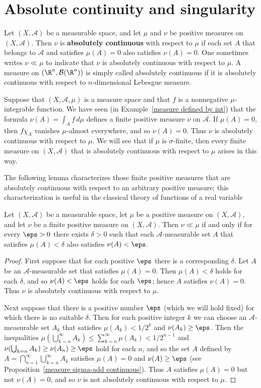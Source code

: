 \section{Absolute continuity and singularity}
Let $(X,\mathcal{A})$ be a measurable space, and let $\mu$ and $\nu$ be positive measures on $(X,\mathcal{A})$. Then $\nu$ is \textbf{absolutely continuous} with respect to $\mu$ if each set $A$ that belongs to $\mathcal{A}$ and satisfies $\mu(A)=0$ also satisfies $\nu(A)=0$. One sometimes writes $\nu\ll\mu$ to indicate that $\nu$ is absolutely continuous with respect to $\mu$. A measure on $(\R^n,\mathcal{B}(\R^n))$ is simply called absolutely continuous if it is absolutely continuous with respect to $n$-dimensional Lebesgue measure.\par
Suppose that $(X,\mathcal{A},\mu)$ is a measure space and that $f$ is a nonnegative $\mu$-integrable function. We have seen (in Example~\ref{measure defined by int}) that the formula $\nu(A)=\int_Af\,d\mu$ defines a finite positive measure $\nu$ on $\mathcal{A}$. If $\mu(A)=0$, then $f\chi_A$ vanishes $\mu$-almost everywhere, and so $\nu(A)=0$. Thus $\nu$ is absolutely continuous with respect to $\mu$. We will see that if $\mu$ is $\sigma$-finite, then every finite measure on $(X,\mathcal{A})$ that is absolutely continuous with respect to $\mu$ arises in this way.\par
The following lemma characterizes those finite positive measures that are absolutely continuous with respect to an arbitrary positive measure; this characterization is useful in the classical theory of functions of a real variable
\begin{lemma}\label{measure finite absolutely continuous iff}
Let $(X,\mathcal{A})$ be a measurable space, let $\mu$ be a positive measure on $(X,\mathcal{A})$, and let $\nu$ be a finite positive measure on $(X,\mathcal{A})$. Then $\nu\ll\mu$ if and only if for every $\eps>0$ there exists $\delta>0$ such that each $\mathcal{A}$-measurable set $A$ that satisfies $\mu(A)<\delta$ also satisfies $\nu(A)<\eps$.
\end{lemma}
\begin{proof}
First suppose that for each positive $\eps$ there is a corresponding $\delta$. Let $A$ be an $\mathcal{A}$-measurable set that satisfies $\mu(A)=0$. Then $\mu(A)<\delta$ holds for each $\delta$, and so $\nu(A)<\eps$ holds for each $\eps$; hence $A$ satisfies $\nu(A)=0$. Thus $\nu$ is absolutely continuous with respect to $\mu$.\par
Next suppose that there is a positive number $\eps$ (which we will hold fixed) for which there is no suitable $\delta$. Then for each positive integer $k$ we can choose an $\mathcal{A}$-measurable set $A_k$ that satisfies $\mu(A_k)<1/2^k$ and $\nu(A_k)\geq\eps$. Then the inequalities $\mu(\bigcup_{k=n}^{\infty}A_k)\leq\sum_{k=n}^{\infty}\mu(A_k)<1/2^{n-1}$ and $\nu(\bigcup_{k=n}A_k)\geq\nu(A_n)\geq\eps$ hold for each $n$, and so the set $A$ defined by $A=\bigcap_{n=1}^{\infty}\bigcup_{k=n}^{\infty}A_k$ satisfies $\mu(A)=0$ and $\nu(A)\geq\eps$ (see Proposition~\ref{measure sigma-add continuous}). Thus $A$ satisfies $\mu(A)=0$ but not $\nu(A)=0$, and so $\nu$ is not absolutely continuous with respect to $\mu$.
\end{proof}
